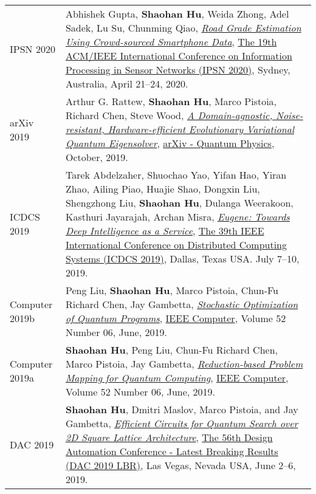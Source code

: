 \begin{longtabu}{p{.51\sectionwidth} p{.78\resumewidth}}
{\sc IPSN 2020}\hypertarget{gupta2020ipsn}{} &
Abhishek Gupta, \textbf{Shaohan Hu}, Weida Zhong, Adel Sadek, Lu Su, Chunming Qiao,
\href{https://ieeexplore.ieee.org/document/9111051}{\emph{Road Grade Estimation Using Crowd-sourced Smartphone Data}},
\href{http://ipsn.acm.org/2020/}{\textsf{The 19th ACM/IEEE International Conference on Information Processing in Sensor Networks (IPSN 2020)}},
Sydney, Australia, April 21--24, 2020. \\

{\sc arXiv 2019}\hypertarget{rattew2019arxiv}{} &
Arthur G. Rattew, \textbf{Shaohan Hu}, Marco Pistoia, Richard Chen, Steve Wood,
\href{https://arxiv.org/abs/1910.09694}{\emph{A Domain-agnostic, Noise-resistant, Hardware-efficient Evolutionary Variational Quantum Eigensolver}},
\href{https://arxiv.org/archive/quant-ph}{\textsf{arXiv - Quantum Physics}},
October, 2019. \\

{\sc ICDCS 2019}\hypertarget{abdelzaher2019icdcs}{} &
Tarek Abdelzaher, Shuochao Yao, Yifan Hao, Yiran Zhao, Ailing Piao, Huajie Shao, Dongxin Liu, Shengzhong Liu, \textbf{Shaohan Hu}, Dulanga Weerakoon, Kasthuri Jayarajah, Archan Misra,
\href{https://ieeexplore.ieee.org/document/8884843}{\emph{Eugene: Towards Deep Intelligence as a Service}},
\href{https://theory.utdallas.edu/ICDCS2019/}{\textsf{The 39th IEEE International Conference on Distributed Computing Systems (ICDCS 2019)}},
Dallas, Texas USA. July 7--10, 2019. \\

{\sc Computer 2019b}\hypertarget{liu2019computer}{} &
Peng Liu, \textbf{Shaohan Hu}, Marco Pistoia, Chun-Fu Richard Chen, Jay Gambetta,
\href{https://doi.ieeecomputersociety.org/10.1109/MC.2019.2909711}{\emph{Stochastic Optimization of Quantum Programs}},
\href{https://www.computer.org/csdl/magazines/co}{\textsf{IEEE Computer}},
Volume 52 Number 06, June, 2019. \\

{\sc Computer 2019a}\hypertarget{hu2019computer}{} &
\textbf{Shaohan Hu}, Peng Liu, Chun-Fu Richard Chen, Marco Pistoia, Jay Gambetta,
\href{https://doi.ieeecomputersociety.org/10.1109/MC.2019.2909709}{\emph{Reduction-based Problem Mapping for Quantum Computing}},
\href{https://www.computer.org/csdl/magazines/co}{\textsf{IEEE Computer}},
Volume 52 Number 06, June, 2019. \\

{\sc DAC 2019}\hypertarget{hu2019dac}{} &
\textbf{Shaohan Hu}, Dmitri Maslov, Marco Pistoia, and Jay Gambetta,
\href{https://dl.acm.org/citation.cfm?id=3316781.3322464}{\emph{Efficient Circuits for Quantum Search over 2D Square Lattice Architecture}},
\href{https://dac.com/late-breaking-results}{\textsf{The 56th Design Automation Conference - Latest Breaking Results (DAC 2019 LBR)}},
Las Vegas, Nevada USA, June 2--6, 2019. \\


\end{longtabu}
